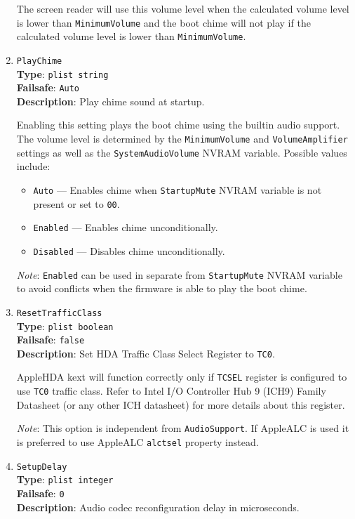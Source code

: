 \documentclass[]{article}
\providecommand{\tightlist}{%
  \setlength{\itemsep}{0pt}\setlength{\parskip}{0pt}}
\begin{document}
\begin{enumerate}
  The screen reader will use this volume level when the calculated volume level is lower
  than \texttt{MinimumVolume} and the boot chime will not play if the calculated
  volume level is lower than \texttt{MinimumVolume}.

\item
  \texttt{PlayChime}\\
  \textbf{Type}: \texttt{plist\ string}\\
  \textbf{Failsafe}: \texttt{Auto}\\
  \textbf{Description}: Play chime sound at startup.

  Enabling this setting plays the boot chime using the builtin audio support. The volume
  level is determined by the \texttt{MinimumVolume} and \texttt{VolumeAmplifier} settings
  as well as the \texttt{SystemAudioVolume} NVRAM variable. Possible values include:

  \begin{itemize}
    \tightlist
    \item \texttt{Auto} --- Enables chime when \texttt{StartupMute} NVRAM variable
      is not present or set to \texttt{00}.
    \item \texttt{Enabled} --- Enables chime unconditionally.
    \item \texttt{Disabled} --- Disables chime unconditionally.
  \end{itemize}

  \emph{Note}: \texttt{Enabled} can be used in separate from \texttt{StartupMute}
  NVRAM variable to avoid conflicts when the firmware is able to play the boot chime.

\item
  \texttt{ResetTrafficClass}\\
  \textbf{Type}: \texttt{plist\ boolean}\\
  \textbf{Failsafe}: \texttt{false}\\
  \textbf{Description}: Set HDA Traffic Class Select Register to \texttt{TC0}.

  AppleHDA kext will function correctly only if \texttt{TCSEL} register is configured
  to use \texttt{TC0} traffic class. Refer to Intel I/O Controller Hub 9 (ICH9) Family
  Datasheet (or any other ICH datasheet) for more details about this register.

  \emph{Note}: This option is independent from \texttt{AudioSupport}. If AppleALC is used
  it is preferred to use AppleALC \texttt{alctsel} property instead.

\item
  \texttt{SetupDelay}\\
  \textbf{Type}: \texttt{plist\ integer}\\
  \textbf{Failsafe}: \texttt{0}\\
  \textbf{Description}: Audio codec reconfiguration delay in microseconds.


\end{enumerate}
\end{document}
